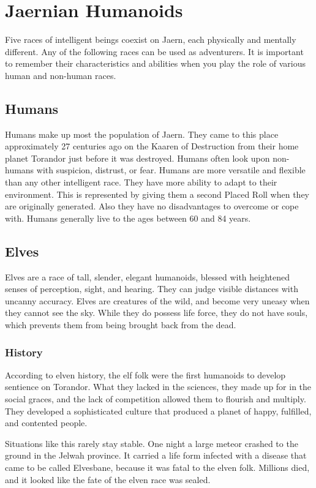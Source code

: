 \chapter{Jaernian Humanoids}
\label{ch:jaern-humanoids}
\setlength{\columnsep}{\defcolwidth}\begin{multicols*}{2}
Five races of intelligent beings coexist on Jaern, each physically and mentally different. Any of the following races can be used as adventurers. It is important to remember their characteristics and abilities when you play the role of various human and non-human races.
\section{Humans}
Humans make up most the population of Jaern. They came to this place approximately 27 centuries ago on the Kaaren of Destruction from their home planet Torandor just before it was destroyed. Humans often look upon non-humans with suspicion, distrust, or fear. Humans are more versatile and flexible than any other intelligent race. They have more ability to adapt to their environment. This is represented by giving them a second Placed Roll when they are originally generated. Also they have no disadvantages to overcome or cope with. Humans generally live to the ages between 60 and 84 years.
\makeline
\section{Elves}
Elves are a race of tall, slender, elegant humanoids, blessed with heightened senses of perception, sight, and hearing. They can judge visible distances with uncanny accuracy. Elves are creatures of the wild, and become very uneasy when they cannot see the sky. While they do possess life force, they do not have souls, which prevents them from being brought back from the dead.
\subsection{History}
According to elven history, the elf folk were the first humanoids to develop sentience on Torandor. What they lacked in the sciences, they made up for in the social graces, and the lack of competition allowed them to flourish and multiply. They developed a sophisticated culture that produced a planet of happy, fulfilled, and contented people.

Situations like this rarely stay stable. One night a large meteor crashed to the ground in the Jelwah province. It carried a life form infected with a disease that came to be
called Elvesbane, because it was fatal to the elven folk. Millions died, and it looked like the fate of the elven race was sealed.


\end{multicols*}
